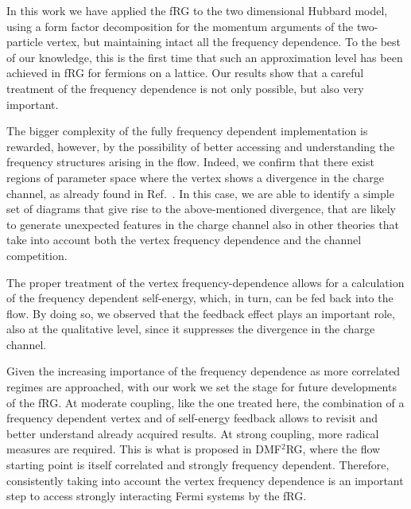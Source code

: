 In this work we have applied the fRG to the two dimensional Hubbard model, using a form factor decomposition for the momentum arguments of the two-particle vertex, but maintaining intact all the frequency dependence. 
To the best of our knowledge, this is the first time that such an approximation level has been achieved in fRG for fermions on a lattice.
Our results show that a careful treatment of the frequency dependence is not only possible, but also very important.

The bigger complexity of the fully frequency dependent implementation is rewarded, however, by the possibility of better accessing and understanding the frequency structures arising in the flow. Indeed, we confirm that there exist regions of parameter space where the vertex shows a divergence in the charge channel, as already found in Ref.~.
In this case, we are able to identify a simple set of diagrams that give rise to the above-mentioned divergence, that are likely to generate unexpected features in the charge channel also in other theories that take into account both the vertex frequency dependence and the channel competition.\cite{Stepanov2016}
 
The proper treatment of the vertex frequency-dependence allows for a calculation of the frequency dependent self-energy, which, in turn, can be fed back into the flow.
By doing so, we observed that the feedback effect plays an important role, also at the qualitative level, since it suppresses the divergence in the charge channel. 

Given the increasing importance of the frequency dependence as more correlated regimes are approached, with our work we set the stage for future developments of the fRG.
At moderate coupling, like the one treated here, the combination of a frequency dependent vertex and of self-energy feedback allows to revisit and better understand already acquired results. At strong coupling, more radical measures are required. 
This is what is proposed in DMF$^2$RG,\cite{Taranto2014} where the flow starting point is itself correlated and strongly frequency dependent. 
Therefore, consistently taking into account the vertex frequency dependence is an important step to access strongly interacting Fermi systems by the fRG.
